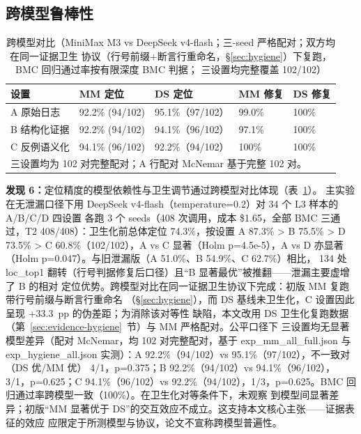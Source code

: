 \documentclass[twocolumn,10pt]{ctexart}
\begin{document}
\subsection{跨模型鲁棒性}

\begin{table}[!t]
\centering
\caption{跨模型对比（MiniMax M3 vs DeepSeek v4-flash；三-seed 严格配对；双方均在同一证据卫生
协议（行号前缀+断言行重命名，\S\ref{sec:hygiene}）下复跑，BMC 回归通过率按有限深度 BMC 判据；
三设置均完整覆盖 102/102）}
\label{tab:cross_model}
\scriptsize
\setlength{\tabcolsep}{1.5pt}
\renewcommand{\arraystretch}{1.12}
\begin{tabular}{p{}p{}p{}p{}p{}}
\toprule
\textbf{设置} & \textbf{MM 定位} & \textbf{DS 定位} & \textbf{MM 修复} & \textbf{DS 修复} \\
\midrule
A 原始日志 & 92.2\% (94/102) & 95.1\%（97/102） & 99.0\% & 100\% \\
B 结构化证据 & 92.2\% (94/102) & 94.1\%（96/102） & 97.1\% & 100\% \\
C 反例语义化 & 94.1\% (96/102) & 92.2\%（94/102） & 100\% & 100\% \\
\bottomrule
\multicolumn{5}{p{0.9\columnwidth}}{\footnotesize 三设置均为 102 对完整配对；A 行配对 McNemar 基于完整 102 对。}
\end{tabular}
\end{table}

\textbf{发现 6：}定位精度的模型依赖性与卫生调节通过跨模型对比体现（表~\ref{tab:cross_model}）。
主实验在无泄漏口径下用 DeepSeek v4-flash（temperature=0.2）对 34 个 L3 样本的 A/B/C/D 四设置
各跑 3 个 seeds（408 次调用，成本 \$1.65，全部 BMC 三通过，T2 408/408）：卫生化前总体定位
74.3\%，按设置 A 87.3\% > B 75.5\% > D 73.5\% > C 60.8\%（102/102），A vs C 显著（Holm
p=4.5e-5），A vs D 亦显著（Holm p=0.047）。与旧泄漏版（A 51.0\%、B 54.9\%、C 62.7\%）相比，
134 处 loc\_top1 翻转（行号判据修复后口径）且“B 显著最优”被推翻——泄漏主要虚增了 B 的相对
定位优势。跨模型对比在同一证据卫生协议下完成：初版 MM 复跑带行号前缀与断言行重命名
（\S\ref{sec:hygiene}），而 DS 基线未卫生化，C 设置因此呈现 +33.3~pp 的伪差距；为消除该对等性
缺陷，本文改用 DS 卫生化复跑数据（第~\ref{sec:evidence-hygiene}~节）与 MM 严格配对。公平口径下
三设置均无显著模型差异（配对 McNemar，均 102 对完整配对，基于 exp\_mm\_all\_full.json 与
exp\_hygiene\_all.json 实测）：A 92.2\%（94/102）vs 95.1\%（97/102），不一致对（DS 优/MM 优）
4/1，p=0.375；B 92.2\%（94/102）vs 94.1\%（96/102），3/1，p=0.625；C 94.1\%（96/102）vs
92.2\%（94/102），1/3，p=0.625。BMC 回归通过率跨模型一致（100\%）。在卫生化对等条件下，未观察
到模型间显著差异；初版“MM 显著优于 DS”的交互效应不成立。这支持本文核心主张——证据表征的效应
应限定于所测模型与协议，论文不宣称跨模型普遍性。
\end{document}
